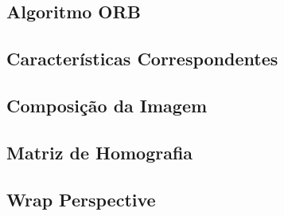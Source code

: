 \subsection{Algoritmo ORB}
\subsection{Características Correspondentes}
\subsection{Composição da Imagem}
\subsection{Matriz de Homografia}
\subsection{Wrap Perspective}